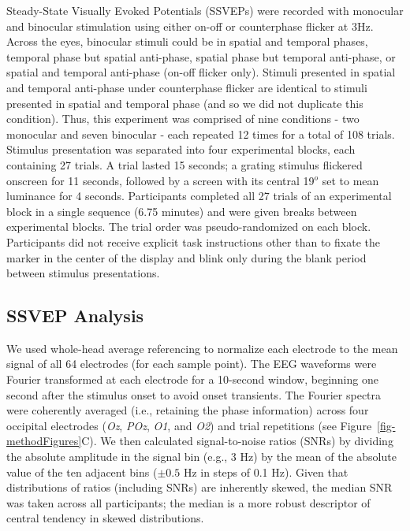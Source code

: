 \documentclass[review,
  12pt,
]{elsarticle}
\begin{document}
Steady-State Visually Evoked Potentials (SSVEPs) were recorded with
monocular and binocular stimulation using either on-off or counterphase
flicker at 3Hz. Across the eyes, binocular stimuli could be in spatial
and temporal phases, temporal phase but spatial anti-phase, spatial
phase but temporal anti-phase, or spatial and temporal anti-phase
(on-off flicker only). Stimuli presented in spatial and temporal
anti-phase under counterphase flicker are identical to stimuli presented
in spatial and temporal phase (and so we did not duplicate this
condition). Thus, this experiment was comprised of nine conditions - two
monocular and seven binocular - each repeated 12 times for a total of
108 trials. Stimulus presentation was separated into four experimental
blocks, each containing 27 trials. A trial lasted 15 seconds; a grating
stimulus flickered onscreen for 11 seconds, followed by a screen with
its central 19\(^o\) set to mean luminance for 4 seconds. Participants
completed all 27 trials of an experimental block in a single sequence
(6.75 minutes) and were given breaks between experimental blocks. The
trial order was pseudo-randomized on each block. Participants did not
receive explicit task instructions other than to fixate the marker in
the center of the display and blink only during the blank period between
stimulus presentations.

\subsection{SSVEP Analysis}\label{ssvep-analysis}

We used whole-head average referencing to normalize each electrode to
the mean signal of all 64 electrodes (for each sample point). The EEG
waveforms were Fourier transformed at each electrode for a 10-second
window, beginning one second after the stimulus onset to avoid onset
transients. The Fourier spectra were coherently averaged (i.e.,
retaining the phase information) across four occipital electrodes
(\emph{Oz}, \emph{POz}, \emph{O1}, and \emph{O2}) and trial repetitions
(see Figure~\ref{fig-methodFigures}C). We then calculated
signal-to-noise ratios (SNRs) by dividing the absolute amplitude in the
signal bin (e.g., 3 Hz) by the mean of the absolute value of the ten
adjacent bins (\(\pm 0.5\) Hz in steps of 0.1 Hz). Given that
distributions of ratios (including SNRs) are inherently skewed, the
median SNR was taken across all participants; the median is a more
robust descriptor of central tendency in skewed distributions.
\end{document}

